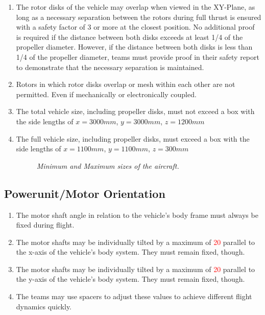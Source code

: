 \documentclass{article}
\begin{document}
\begin{enumerate}
  \item The rotor disks of the vehicle may overlap when viewed in the XY-Plane, as long as a necessary separation between the rotors during full thrust is ensured with a safety factor of 3 or more at the closest position. No additional proof is required if the distance between both disks exceeds at least 1/4 of the propeller diameter. However, if the distance between both disks is less than 1/4 of the propeller diameter, teams must provide proof in their safety report to demonstrate that the necessary separation is maintained.  \item Rotors in which rotor disks overlap or mesh within each other are not permitted. Even if mechanically or electronically coupled.
  \item The total vehicle size, including propeller disks, must not exceed a box with the side lengths of $x=3000mm$, $y=3000mm$, $z=1200mm$
  \item The full vehicle size, including propeller disks, must exceed a box with the side lengths of $x=1100mm$, $y=1100mm$, $z=300mm$

  \begin{figure}[h!]
    \centering
    \caption{\textit{Minimum and Maximum sizes of the aircraft.}}
  \end{figure}
    
\end{enumerate}

\subsection{Powerunit/Motor Orientation}
\begin{enumerate}
  \item The motor shaft angle in relation to the vehicle's body frame must always be fixed during flight. 
  \item The motor shafts may be individually tilted by a maximum of \textcolor{red}{20\degree} parallel to the x-axis of the vehicle's body system. They must remain fixed, though.
  \item The motor shafts may be individually tilted by a maximum of \textcolor{red}{20\degree}  parallel to the y-axis of the vehicle's body system. They must remain fixed, though.
  \item The teams may use spacers to adjust these values to achieve different flight dynamics quickly.
\end{enumerate}
\end{document}
